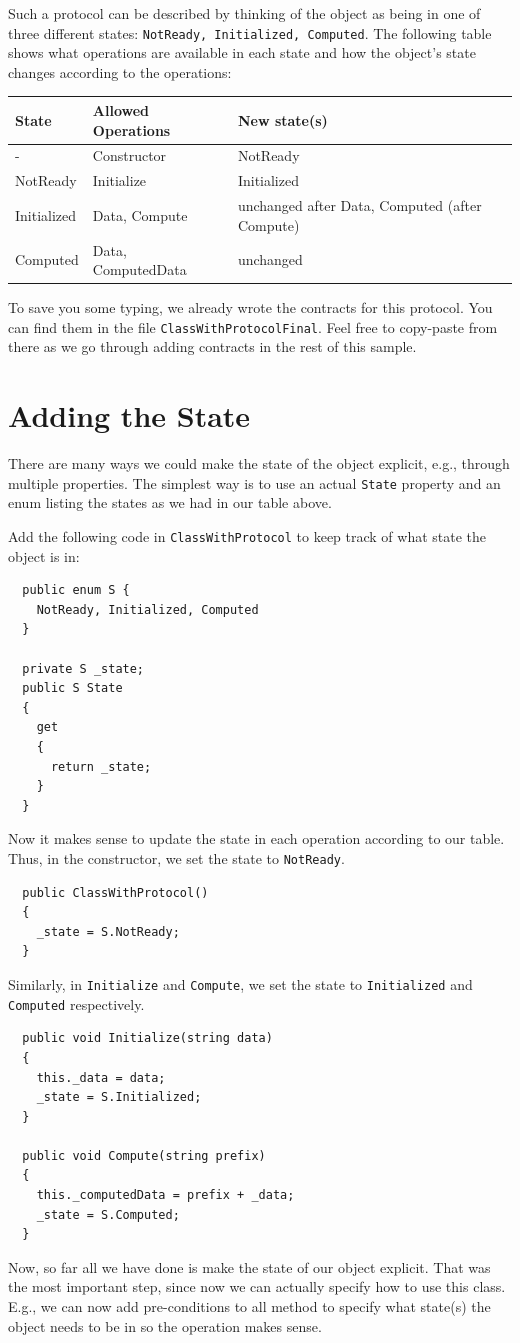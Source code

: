 \documentclass{article}
\newcommand{\code}[1]{\lstinline{#1}}
\begin{document}
Such a protocol can be described by thinking of the object as being in
one of three different states: \code{NotReady, Initialized, Computed}.
The following table shows what operations are available in each state
and how the object's state changes according to the operations:

\begin{tabular}{|l|l|p{2in}|}
\hline
State & Allowed Operations & New state(s)
\\
\hline
\hline
- & Constructor & NotReady
\\
\hline
NotReady & Initialize & Initialized
\\
\hline
Initialized & Data, Compute & unchanged after Data, Computed (after
Compute)
\\
\hline
Computed & Data, ComputedData & unchanged
\\
\hline
\end{tabular}

To save you some typing, we already wrote the contracts for this
protocol. You can find them in the file
\code{ClassWithProtocolFinal}. Feel free to copy-paste from there as
we go through adding contracts in the rest of this sample.

\section{Adding the State}
There are many ways we could make the state of the object
explicit, e.g., through multiple properties. The simplest way is to
use an actual \code{State} property and an enum listing the states as
we had in our table above.

Add the following code in \code{ClassWithProtocol} to keep track of
what state the object is in:
\begin{lstlisting}
  public enum S {
    NotReady, Initialized, Computed
  }

  private S _state;
  public S State
  {
    get
    {
      return _state;
    }
  }
\end{lstlisting}
Now it makes sense to update the state in each operation according to
our table. Thus, in the constructor, we set the state to
\code{NotReady}.
\begin{lstlisting}
  public ClassWithProtocol()
  {
    _state = S.NotReady;
  }
\end{lstlisting}
Similarly, in \code{Initialize} and \code{Compute}, we set the state
to \code{Initialized} and \code{Computed} respectively.
\begin{lstlisting}
  public void Initialize(string data)
  {
    this._data = data;
    _state = S.Initialized;
  }

  public void Compute(string prefix)
  {
    this._computedData = prefix + _data;
    _state = S.Computed;
  }
\end{lstlisting}
Now, so far all we have done is make the state of our object
explicit. That was the most important step, since now we can actually
specify how to use this class. E.g., we can now add pre-conditions to
all method to specify what state(s) the object needs to be in so the
operation makes sense.
\end{document}
